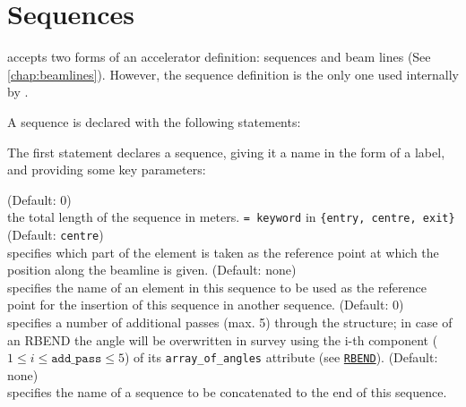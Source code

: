 
\chapter{Sequences}
\label{chap:sequence}

\madx accepts two forms of an accelerator definition: sequences and
beam lines (See \ref{chap:beamlines}). 
However, the sequence definition is the only one used internally by \madx.

A sequence is declared with the following statements:

The first statement declares a sequence, giving it a name in the form of
a label, and providing some key parameters: 

\begin{madlist}
   (Default: 0)\\
  the total length of the sequence in meters. 
  \texttt{= keyword} in \texttt{\{entry, centre, exit\}}
  (Default: \texttt{centre}) \\
  specifies which part of the element is taken as the reference point 
  at which the position along the beamline is given.
   (Default: none)\\
  specifies the name of an element in this sequence to be used as the
  reference point for the insertion of this sequence in another
  sequence.
   (Default: 0)\\ 
  specifies a number of additional passes (max. 5) through the
  structure; in case of an RBEND the angle will be overwritten in  survey
  using the i-th component ($1 \le i \le \mathtt{add\_pass} \le 5$) of
  its \texttt{array\_of\_angles} attribute (see
  \hyperref[bend-rbend]{\texttt{RBEND}}).  
   (Default: none)\\
  specifies the name of a sequence to be concatenated 
  to the end of this sequence.
\end{madlist}
 
